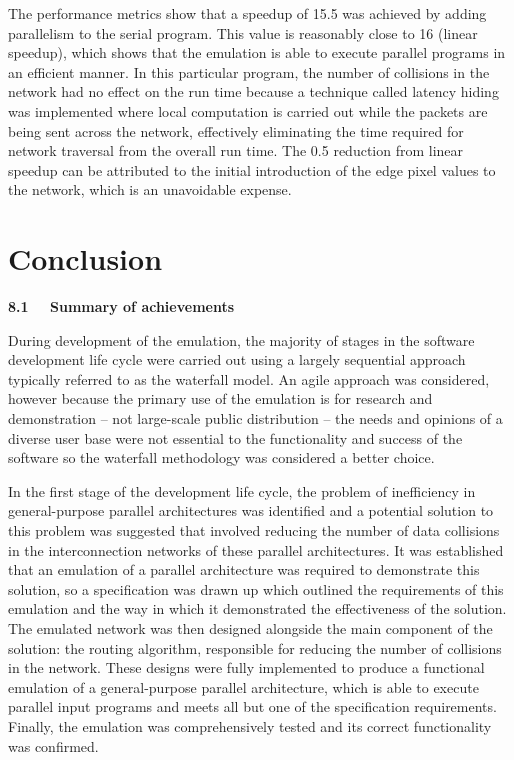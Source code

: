 \documentclass[a4paper, 12pt]{article}
\begin{document}
The performance metrics show that a speedup of 15.5 was achieved by adding parallelism to the serial program. This value is reasonably close to 16 (linear speedup), which shows that the emulation is able to execute parallel programs in an efficient manner. In this particular program, the number of collisions in the network had no effect on the run time because a technique called latency hiding was implemented where local computation is carried out while the packets are being sent across the network, effectively eliminating the time required for network traversal from the overall run time. The 0.5 reduction from linear speedup can be attributed to the initial introduction of the edge pixel values to the network, which is an unavoidable expense.

\newpage
\section{Conclusion}
\vspace{-1mm}
\noindent\textbf{\large 8.1 \ \ Summary of achievements}

\noindent During development of the emulation, the majority of stages in the software development life cycle were carried out using a largely sequential approach typically referred to as the waterfall model. An agile approach was considered, however because the primary use of the emulation is for research and demonstration -- not large-scale public distribution -- the needs and opinions of a diverse user base were not essential to the functionality and success of the software so the waterfall methodology was considered a better choice.

In the first stage of the development life cycle, the problem of inefficiency in general-purpose parallel architectures was identified and a potential solution to this problem was suggested that involved reducing the number of data collisions in the interconnection networks of these parallel architectures. It was established that an emulation of a parallel architecture was required to demonstrate this solution, so a specification was drawn up which outlined the requirements of this emulation and the way in which it demonstrated the effectiveness of the solution.
The emulated network was then designed alongside the main component of the solution: the routing algorithm, responsible for reducing the number of collisions in the network. These designs were fully implemented to produce a functional emulation of a general-purpose parallel architecture, which is able to execute parallel input programs and meets all but one of the specification requirements. Finally, the emulation was comprehensively tested and its correct functionality was confirmed.
\end{document}
